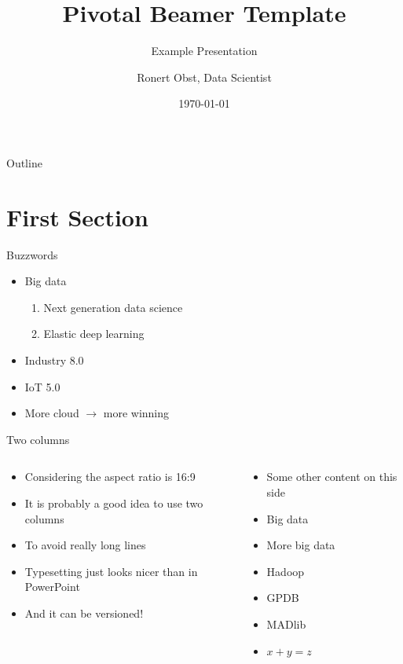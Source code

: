 \documentclass[english,presentation]{pivotalbeamer}
\author{Ronert Obst, Data Scientist}
\date{\today}
\title{Pivotal Beamer Template}
\subtitle{Example Presentation}
\begin{document}
\maketitle
\begin{frame}{Outline}
\tableofcontents
\end{frame}

\section{First Section}
\label{sec-1}
\begin{frame}[fragile,label=sec-1-1]{Buzzwords}
\begin{itemize}
\item Big data
\begin{enumerate}
\item Next generation data science
\item Elastic deep learning
\end{enumerate}
\item Industry 8.0
\item IoT 5.0
\item More cloud $\rightarrow$ more winning
\end{itemize}
\end{frame}

\begin{frame}[fragile,label=sec-1-2]{Two columns}
\begin{columns}
\begin{column}{0.5\textwidth}
\begin{itemize}
\item Considering the aspect ratio is 16:9
\item It is probably a good idea to use two columns
\item To avoid really long lines
\item Typesetting just looks nicer than in PowerPoint
\item And it can be versioned!
\end{itemize}
\end{column}

\begin{column}{0.5\textwidth}
\begin{itemize}
\item Some other content on this side
\item Big data
\item More big data
\item Hadoop
\item GPDB
\item MADlib
\item $x+y = z$
\end{itemize}
\end{column}
\end{columns}
\end{frame}
\end{document}
